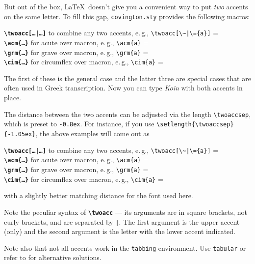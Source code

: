 \documentclass[english]{article}
\newcommand*\jmacro[1]{\textbf{\texttt{#1}}}
\newcommand*\jcsmacro[1]{\jmacro{\textbackslash{#1}}}
\newcommand*\jfenv[1]{\texttt{#1}}
\begin{document}
But out of the box, \LaTeX\ doesn't give you a convenient way to put \emph{two}
accents on the same letter.  To fill this gap, \texttt{covington.sty} provides
the following macros:
\begin{flushleft}
	\jcsmacro{twoacc[\ldots|\ldots]} \quad to combine any two accents, e.\,g.,
	               \lstinline[moretexcs={twoacc}].\twoacc[\~|\={a}]. = \twoacc[\~|\={a}]\\[6pt]
	\jcsmacro{acm\{\ldots\}} \quad for acute over macron, e.\,g., \lstinline[moretexcs={acm}].\acm{a}. = \\
	\jcsmacro{grm\{\ldots\}} \quad for grave over macron, e.\,g., \lstinline[moretexcs={grm}].\grm{a}. = \\
	\jcsmacro{cim\{\ldots\}} \quad for circumflex over macron, e.\,g., \lstinline[moretexcs={cim}].. = \cim{a}
\end{flushleft}
The first of these is the general case and the latter three are special
cases that are often used in Greek transcription. Now you can type
\emph{Koin} with both accents in place.

The distance between the two accents can be adjusted via the length
\verb"\twoaccsep", which is preset to \texttt{-0.8ex}.
For instance, if you use \verb"\setlength{\twoaccsep}{-1.05ex}", the above examples will come out as

\setlength{\twoaccsep}{-1.05ex}
\begin{flushleft}
	\jcsmacro{twoacc[\ldots|\ldots]} \quad to combine any two accents, e.\,g.,
	\lstinline[moretexcs={twoacc}].\twoacc[\~|\={a}]. = \twoacc[\~|\={a}]\\[6pt]
	\jcsmacro{acm\{\ldots\}} \quad for acute over macron, e.\,g., \lstinline[moretexcs={acm}].\acm{a}. = \\
	\jcsmacro{grm\{\ldots\}} \quad for grave over macron, e.\,g., \lstinline[moretexcs={grm}].\grm{a}. = \\
	\jcsmacro{cim\{\ldots\}} \quad for circumflex over macron, e.\,g., \lstinline[moretexcs={cim}].. = \cim{a}
\end{flushleft}
with a slightly better matching distance for the font used here.

Note the peculiar syntax of \jcsmacro{twoacc} --- its arguments are in
square brackets, not curly brackets, and are separated by \verb.|..
The first argument is the upper accent (only) and the second argument
is the letter with the lower accent indicated.

Note also that not all accents work in the \jfenv{tabbing} environment.
Use \jfenv{tabular} or refer to \cite{pakin} for alternative solutions.
\end{document}
